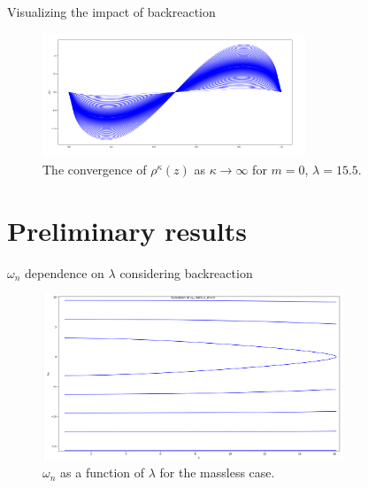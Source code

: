 \begin{frame}{Visualizing the impact of backreaction}
	\begin{figure}[h]
		\centering
		\includegraphics[width=0.7\textwidth]{figures/convergence_to_rho_a_10_0.png}
		\caption{The convergence of $\rho^{\kappa}(z)$ as $\kappa\to \infty$ for $m=0$, $\lambda=15.5$.}
		\label{fig:figures-impact-of-backreaction-png}
	\end{figure}

\end{frame}

\section{Preliminary results}

\begin{frame}{$\omega_n$ dependence on $\lambda$ considering backreaction}
	\begin{figure}[h]
		\centering
		\includegraphics[width=0.8\textwidth]{figures/eigenvalue_evolution_a_1_0.png}
		\caption{$\omega_n$ as a function of $\lambda$ for the massless case.}
		\label{fig:figures-eigenvalue_evolution_a_1_0-png}
	\end{figure}

\end{frame}

